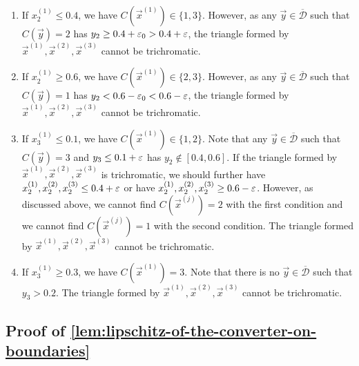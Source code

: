    \begin{enumerate}[itemsep=0em,topsep=0.5em]
        \item If $x^{(1)}_2\leq 0.4$, we have $C(\vec{x}^{(1)})\in \{1,3\}$. However, as any $\vec{y}\in \overline{\mathcal{D}}$ such that $C(\vec{y})=2$ has $y_2\geq 0.4+\varepsilon_0>0.4+\varepsilon$, the triangle formed by $\vec{x}^{(1)},\vec{x}^{(2)},\vec{x}^{(3)}$ cannot be trichromatic. 
        \item If $x^{(1)}_2\geq 0.6$, we have $C(\vec{x}^{(1)})\in \{2,3\}$. However, as any $\vec{y}\in \overline{\mathcal{D}}$ such that $C(\vec{y})=1$ has $y_2<0.6-\varepsilon_0<0.6-\varepsilon$, the triangle formed by $\vec{x}^{(1)},\vec{x}^{(2)},\vec{x}^{(3)}$ cannot be trichromatic. 
        \item If $x^{(1)}_3 \leq 0.1$, we have $C(\vec{x}^{(1)})\in \{1,2\}$. Note that any $\vec{y}\in \overline{\mathcal{D}}$ such that $C(\vec{y})=3$ and $y_3\leq 0.1+\varepsilon$ has $y_2\notin [0.4,0.6]$. If the triangle formed by $\vec{x}^{(1)}, \vec{x}^{(2)}, \vec{x}^{(3)}$ is trichromatic, we should further have $x_2^{(1)}, x_2^{(2)}, x_2^{(3)}\leq 0.4+\varepsilon$ or have $x_2^{(1)}, x_2^{(2)}, x_2^{(3)}\geq 0.6-\varepsilon$. However, as discussed above, we cannot find $C(\vec{x}^{(j)})=2$ with the first condition and we cannot find $C(\vec{x}^{(j)})=1$ with the second condition. The triangle formed by $\vec{x}^{(1)},\vec{x}^{(2)},\vec{x}^{(3)}$ cannot be trichromatic. 
        \item If $x_3^{(1)}\geq 0.3$, we have $C(\vec{x}^{(1)})=3$. Note that there is no $\vec{y}\in \overline{\mathcal{D}}$ such that $y_3>0.2$. The triangle formed by $\vec{x}^{(1)},\vec{x}^{(2)},\vec{x}^{(3)}$ cannot be trichromatic. 
    \end{enumerate}


\subsection{Proof of \cref{lem:lipschitz-of-the-converter-on-boundaries}}
\label{proof:lipschitz-of-the-converter-on-boundaries}

\repii*

